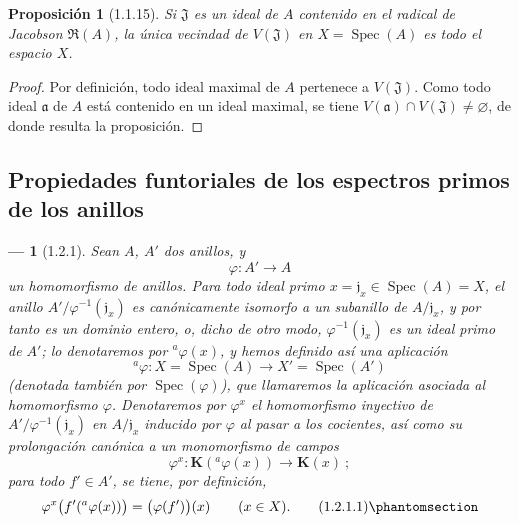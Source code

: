 \documentclass[oneside]{amsart}
\theoremstyle{ega-env-style}
\newtheorem*{env}{---}
\theoremstyle{ega-thm-env-style}
\newtheorem*{proposition}{Proposición}
\theoremstyle{ega-defn-env-style}
\let\EGAOriginalLabel\label
\renewcommand{\label}[1]{\phantomsection\EGAOriginalLabel{#1}}
\begin{document}
\begin{proposition}[1.1.15]
\label{I.1.1.15}
Si $\mathfrak{J}$ es un ideal de $A$ contenido en el radical de Jacobson $\mathfrak{R}(A)$, la única
vecindad de $V(\mathfrak{J})$ en $X=\operatorname{Spec}(A)$ es todo el espacio $X$.
\end{proposition}

\begin{proof}
Por definición, todo ideal maximal de $A$ pertenece a $V(\mathfrak{J})$.
Como todo ideal $\mathfrak{a}$ de $A$ está contenido en un ideal maximal, se tiene $V(\mathfrak{a})\cap V(\mathfrak{J})\neq\varnothing$, de donde resulta la proposición.
\end{proof}

\subsection{Propiedades funtoriales de los espectros primos de los anillos}
\label{subsection:I.1.2}

\begin{env}[1.2.1]
\label{I.1.2.1}
Sean $A$, $A'$ dos anillos, y
\[
  \varphi:A'\longrightarrow A
\]
un homomorfismo de anillos.
Para todo ideal primo $x=\mathfrak{j}_x\in\operatorname{Spec}(A)=X$, el anillo $A'/\varphi^{-1}(\mathfrak{j}_x)$ es canónicamente isomorfo a un subanillo de $A/\mathfrak{j}_x$, y por tanto es un dominio entero, o, dicho de otro modo, $\varphi^{-1}(\mathfrak{j}_x)$ es un ideal primo de $A'$;
lo denotaremos por ${}^a\varphi(x)$, y hemos definido así una aplicación
\[
  {}^a\varphi:X=\operatorname{Spec}(A)\longrightarrow
  X'=\operatorname{Spec}(A')
\]
(denotada también por $\operatorname{Spec}(\varphi)$), que llamaremos la aplicación \emph{asociada} al homomorfismo $\varphi$.
Denotaremos por $\varphi^x$ el homomorfismo inyectivo de $A'/\varphi^{-1}(\mathfrak{j}_x)$ en $A/\mathfrak{j}_x$ inducido por $\varphi$ al pasar a los cocientes, así como su prolongación canónica a un monomorfismo de campos
\[
  \varphi^x:\boldsymbol{K}({}^a\varphi(x))\longrightarrow\boldsymbol{K}(x)~;
\]
para todo $f'\in A'$, se tiene, por definición,
\begin{equation}
  \varphi^x\bigl(f'({}^a\varphi(x))\bigr)=\bigl(\varphi(f')\bigr)(x)
  \qquad(x\in X).
  \tag{1.2.1.1}\label{I.1.2.1.1-fr}
\end{equation}
\end{env}
\end{document}
